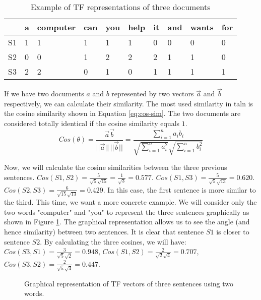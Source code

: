 \documentclass{KBook}
\begin{document}
\begin{table}[ht]
	\centering
	\begin{tabular}{llllllllll}
		\hline\hline
		& a & computer & can & you & help & it & and & wants & for \\
		\hline
		S1 & 1 & 1 & 1 & 1 & 1 & 0 & 0 & 0 & 0\\
		S2 & 0 & 0 & 1 & 2 & 2 & 2 & 1 & 1 & 0\\
		S3 & 2 & 2 & 0 & 1 & 0 & 1 & 1 & 1 & 1\\
		\hline\hline
	\end{tabular}
	\caption{Example of TF representations of three documents}
	\label{tab:tf-exp}
\end{table}

If we have two documents $a$ and $b$ represented by two vectors $\overrightarrow{a}$ and $\overrightarrow{b}$ respectively, we can calculate their similarity. 
The most used similarity in \ac{taln} is the cosine similarity shown in Equation \ref{eq:cos-sim}.
The two documents are considered totally identical if the cosine similarity equals $1$.
\begin{equation}
	Cos(\theta) = \frac{\overrightarrow{a} \overrightarrow{b}}{||\overrightarrow{a}||\, ||\overrightarrow{b}||}
	= \frac{\sum_{i=1}^{n} a_i b_i}{\sqrt{\sum_{i=1}^{n} a_i^2} \sqrt{\sum_{i=1}^{n} b_i^2}}
	\label{eq:cos-sim}
\end{equation}


Now, we will calculate the cosine similarities between the three previous sentences. 
$Cos(S1, S2) = \frac{5}{\sqrt{5} \sqrt{15}} = \frac{1}{\sqrt{3}} = 0.577$. 
$Cos(S1, S3) = \frac{5}{\sqrt{5} \sqrt{13}} = 0.620$.
$Cos(S2, S3) = \frac{6}{\sqrt{15} \sqrt{13}} = 0.429$.
In this case, the first sentence is more similar to the third. 
This time, we want a more concrete example.
We will consider only the two words "computer" and "you" to represent the three sentences graphically as shown in Figure \ref{fig:tf-repr-graph-exp}.
The graphical representation allows us to see the angle (and hence similarity) between two sentences.
It is clear that sentence $S1$ is closer to sentence $S2$.
By calculating the three cosines, we will have:
$Cos(S3, S1) = \frac{3}{\sqrt{5} \sqrt{2}} = 0.948$, 
$Cos(S1, S2) = \frac{2}{\sqrt{2} \sqrt{4}} = 0.707$,
$Cos(S3, S2) = \frac{2}{\sqrt{5} \sqrt{4}} = 0.447$.
\begin{figure}[ht]
	\centering
	\caption{Graphical representation of TF vectors of three sentences using two words.}
	\label{fig:tf-repr-graph-exp}
\end{figure}
\end{document}
